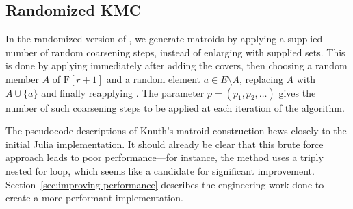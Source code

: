 \subsection{Randomized KMC}
In the randomized version of , we generate matroids by applying a supplied number of random coarsening steps, instead of enlarging with supplied sets. This is done by applying  immediately after adding the covers, then choosing a random member $A$ of $\mathrm{F}[r+1]$ and a random element $a \in E \setminus A$, replacing $A$ with $A \cup \{a\}$ and finally reapplying . The parameter $p = (p_1, p_2, \ldots)$ gives the number of such coarsening steps to be applied at each iteration of the algorithm.

The pseudocode descriptions of Knuth's matroid construction hews closely to the initial Julia implementation. It should already be clear that this brute force approach leads to poor performance---for instance, the  method uses a triply nested for loop, which seems like a candidate for significant improvement. Section~\ref{sec:improving-performance} describes the engineering work done to create a more performant implementation.

